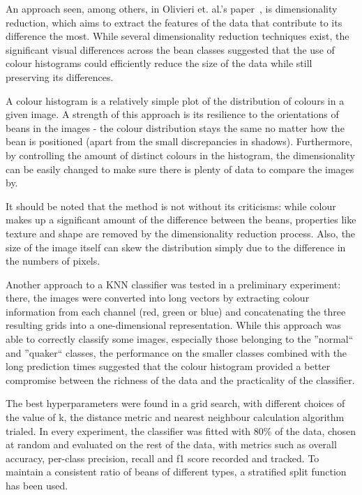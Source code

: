 An approach seen, among others, in Olivieri et. al.'s paper~\cite{hyperspectralGreenOliveri}, is dimensionality reduction,
which aims to extract the features of the data that contribute to its difference the most.
While several dimensionality reduction techniques exist, the significant visual differences across the bean classes suggested
that the use of colour histograms could efficiently reduce the size of the data while still preserving its differences.

A colour histogram is a relatively simple plot of the distribution of colours in a given image.
A strength of this approach is its resilience to the orientations of beans in the images - the colour distribution stays
the same no matter how the bean is positioned (apart from the small discrepancies in shadows).
Furthermore, by controlling the amount of distinct colours in the histogram, the dimensionality can be easily changed to
make sure there is plenty of data to compare the images by.

It should be noted that the method is not without its criticisms: while colour makes up a significant amount of the difference
between the beans, properties like texture and shape are removed by the dimensionality reduction process.
Also, the size of the image itself can skew the distribution simply due to the difference in the numbers of pixels.

Another approach to a KNN classifier was tested in a preliminary experiment:
there, the images were converted into long vectors by extracting colour information from each channel (red, green or blue)
and concatenating the three resulting grids into a one-dimensional representation.
While this approach was able to correctly classify some images, especially those belonging to the ''normal`` and ''quaker``
classes, the performance on the smaller classes combined with the long prediction times suggested that the colour histogram
provided a better compromise between the richness of the data and the practicality of the classifier.

The best hyperparameters were found in a grid search, with different choices of the value of k, the distance metric
and nearest neighbour calculation algorithm trialed.
In every experiment, the classifier was fitted with 80\% of the data, chosen at random and evaluated on the rest of the data,
with metrics such as overall accuracy, per-class precision, recall and f1 score recorded and tracked.
To maintain a consistent ratio of beans of different types, a stratified split function has been used.


